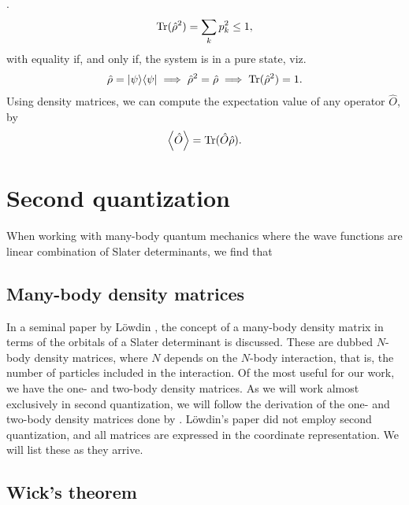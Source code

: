         \cite{modern-qm}.
        \begin{align}
            \operatorname{Tr}(\hat{\rho}^2) = \sum_{k} p_k^2 \leq 1,
        \end{align}
        with equality if, and only if, the system is in a pure state, viz.
        \begin{align}
            \hat{\rho} = | \psi \rangle\langle \psi |
            \implies \hat{\rho}^2 = \hat{\rho}
            \implies \operatorname{Tr}(\hat{\rho}^2) = 1.
        \end{align}
        Using density matrices, we can compute the expectation value of any
        operator $\hat{O}$, by \cite{modern-qm}
        \begin{align}
            \left\langle \hat{O} \right\rangle = \operatorname{Tr}(\hat{O}\hat{\rho}).
        \end{align}

    \section{Second quantization}
        When working with many-body quantum mechanics where the wave functions
        are linear combination of Slater determinants, we find that

        \subsection{Many-body density matrices}
            In a seminal paper by Löwdin \cite{lowdin-density-matrices}, the
            concept of a many-body density matrix in terms of the orbitals of a
            Slater determinant is discussed. These are dubbed $N$-body density
            matrices, where $N$ depends on the $N$-body interaction, that is,
            the number of particles included in the interaction. Of the most
            useful for our work, we have the one- and two-body density matrices.
            As we will work almost exclusively in second quantization, we will
            follow the derivation of the one- and two-body density matrices done
            by \citeauthor{helgaker-molecular}. Löwdin's paper
            \cite{lowdin-density-matrices} did not employ second quantization,
            and all matrices are expressed in the coordinate representation. We
            will list these as they arrive.

        \subsection{Wick's theorem}
